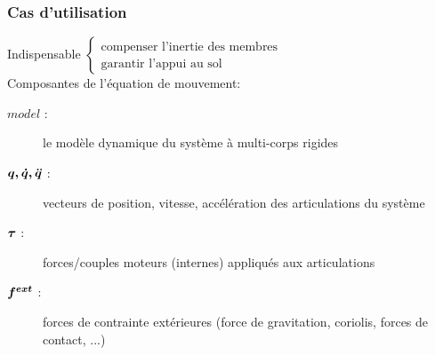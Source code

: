 \documentclass[10pt]{beamer}
\begin{document}
\begin{frame}[allowframebreaks]
  \frametitle{Cas d'utilisation}
  
  Indispensable $\begin{cases}  \text{compenser l'inertie des membres} \\ 
                                \text{garantir l'appui au sol} \end{cases}$  \\
  
  \bigskip
  Composantes de l'équation de mouvement:
  	\begin{description}
	  \item[$model$ :] le modèle dynamique du système à multi-corps rigides
	  \item[$\boldsymbol{q, \dot{q}, \ddot{q}}$ :] vecteurs de position, vitesse, accélération des articulations du système
	  \item[$\boldsymbol{\tau}$ :] forces/couples moteurs (internes) appliqués aux articulations
	  \item[$\boldsymbol{f^{ext}}$ :] forces de contrainte extérieures (force de gravitation, coriolis, forces de contact, ...)
	\end{description}
	
	\framebreak

	

\end{frame}
\end{document}
